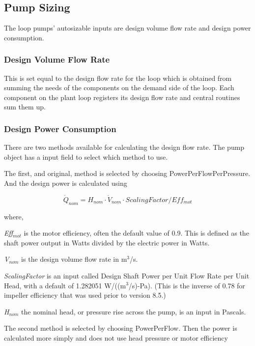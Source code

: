 \subsection{Pump Sizing}\label{pump-sizing}

The loop pumps' autosizable inputs are design volume flow rate and design power consumption.

\subsubsection{Design Volume Flow Rate}\label{design-volume-flow-rate}

This is set equal to the design flow rate for the loop which is obtained from summing the needs of the components on the demand side of the loop. Each component on the plant loop registers its design flow rate and central routines sum them up.

\subsubsection{Design Power Consumption}\label{design-power-consumption}

There are two methods available for calculating the design flow rate. The pump object has a input field to select which method to use.

The first, and original, method is selected by choosing PowerPerFlowPerPressure. And the design power is calculated using

\begin{equation}
\dot Q_{nom} = H_{nom} \cdot \dot V_{nom} \cdot ScalingFactor /Eff_{mot}
\end{equation}

where,

\emph{Eff\(_{mot}\)} is the motor efficiency, often the default value of 0.9. This is defined as the shaft power output in Watts divided by the electric power in Watts.

\emph{V\(_{nom}\)} is the design volume flow rate in m\(^{3}\)/s.

\emph{ScalingFactor} is an input called Design Shaft Power per Unit Flow Rate per Unit Head, with a default of 1.282051 W/((m\(^{3}\)/s)-Pa). (This is the inverse of 0.78 for impeller efficiency that was used prior to version 8.5.)

\emph{H\(_{nom}\)} the nominal head, or pressure rise across the pump, is an input in Pascals.

The second method is selected by choosing PowerPerFlow. Then the power is calculated more simply and does not use head pressure or motor efficiency

